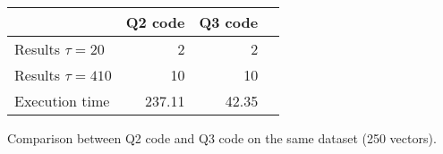 \begin{tabular}{l r r c}
    \toprule
    {} & \textbf{Q2 code} & \textbf{Q3 code} \\
    \midrule
    Results $\tau = 20$ & 2
    & 2  \\
    Results $\tau = 410$ & 10%
    & 10  \\
    \midrule
    Execution time & 237.11 & 42.35&  \\
    \bottomrule
\end{tabular}
\makeatletter{}\makeatother%
\caption{Comparison between Q2 code and Q3 code on the same dataset (250 vectors).}
\label{tab:q2-vs-q3}